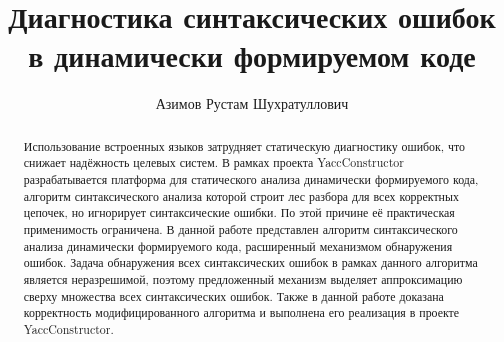 \algrenewcommand\algorithmicindent{1.0em}%

\title{Диагностика синтаксических ошибок в динамически формируемом коде}


\author{Азимов Рустам Шухратуллович}



\maketitle             

\begin{abstract}
Использование встроенных языков затрудняет статическую диагностику ошибок, что снижает надёжность целевых систем. В рамках проекта YaccConstructor разрабатывается платформа для статического анализа динамически формируемого кода, алгоритм синтаксического анализа которой строит лес разбора для всех корректных цепочек, но игнорирует синтаксические ошибки. По этой причине её практическая применимость ограничена. В данной работе представлен алгоритм синтаксического анализа динамически формируемого кода, расширенный механизмом обнаружения ошибок. Задача обнаружения всех синтаксических ошибок в рамках данного алгоритма является неразрешимой, поэтому предложенный механизм выделяет аппроксимацию сверху множества всех синтаксических ошибок. Также в данной работе доказана корректность модифицированного алгоритма и выполнена его реализация в проекте YaccConstructor.
\end{abstract}
             









